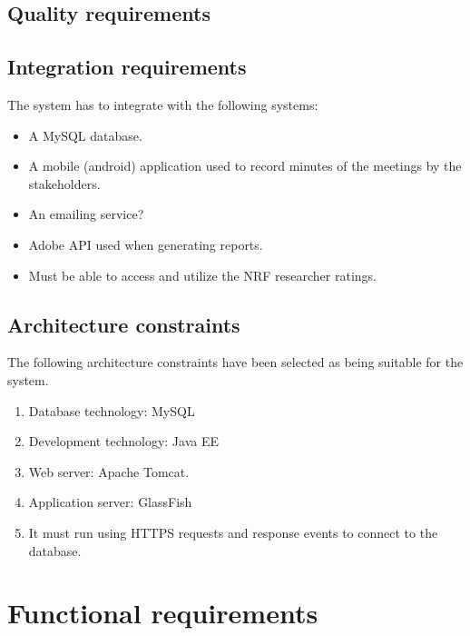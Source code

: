 \documentclass[12pt]{article}
\begin{document}
		\subsection{Quality requirements} %
		\vspace{0.2in}
		
		\vspace{0.2in}
		
		\subsection{Integration requirements} %
		\vspace{0.2in}
		The system has to integrate with the following systems:
		\begin{itemize}
			\item A MySQL database.
			\item A mobile (android) application used to record minutes of the meetings by the stakeholders. 
			\item An emailing service? %
			\item Adobe API used when generating reports.
			\item Must be able to access and utilize the NRF researcher ratings.
		\end{itemize}
		\vspace{0.2in}
		
		\subsection{Architecture constraints} %
		\vspace{0.2in}
		The following architecture constraints have been selected as being suitable for the system.
		\begin{enumerate}
			\item Database technology: MySQL
			\item Development technology: Java EE
			\item Web server: Apache Tomcat.
			\item Application server: GlassFish 
			\item It must run using HTTPS requests and response events to connect to the
database.
		\end{enumerate}
		\vspace{0.5in}
	
	\newpage	
	\section{Functional requirements}
\end{document}

